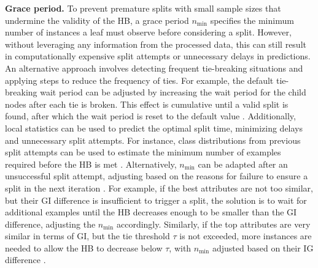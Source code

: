 \textbf{Grace period.} To prevent premature splits with small sample sizes that undermine the validity of the HB, a grace period \( n_{\min} \) specifies the minimum number of instances a leaf must observe before considering a split. However, without leveraging any information from the processed data, this can still result in computationally expensive split attempts or unnecessary delays in predictions. An alternative approach involves detecting frequent tie-breaking situations and applying steps to reduce the frequency of ties. For example, the default tie-breaking wait period can be adjusted by increasing the wait period for the child nodes after each tie is broken. This effect is cumulative until a valid split is found, after which the wait period is reset to the default value \cite{holmes2005tie}. Additionally, local statistics can be used to predict the optimal split time, minimizing delays and unnecessary split attempts. For instance, class distributions from previous split attempts can be used to estimate the minimum number of examples required before the HB is met \cite{losing2018enhancing}. Alternatively, \( n_{\min} \) can be adapted after an unsuccessful split attempt, adjusting based on the reasons for failure to ensure a split in the next iteration \cite{garcia2018hoeffding}. For example, if the best attributes are not too similar, but their GI difference is insufficient to trigger a split, the solution is to wait for additional examples until the HB decreases enough to be smaller than the GI difference, adjusting the \( n_{\min} \) accordingly. Similarly, if the top attributes are very similar in terms of GI, but the tie threshold \( \tau \) is not exceeded, more instances are needed to allow the HB to decrease below \( \tau \), with \( n_{\min} \) adjusted based on their IG difference \cite{garcia2018hoeffding}.

